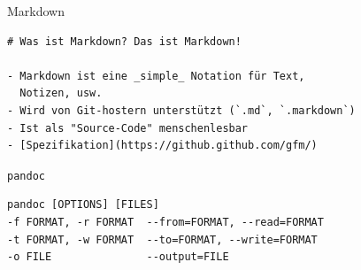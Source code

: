 \documentclass[14pt,aspectratio=169]{beamer}
\begin{document}
\begin{frame}[fragile]{\faMarkdown Markdown}
    \begin{verbatim}
# Was ist Markdown? Das ist Markdown!

- Markdown ist eine _simple_ Notation für Text, 
  Notizen, usw.
- Wird von Git-hostern unterstützt (`.md`, `.markdown`)
- Ist als "Source-Code" menschenlesbar
- [Spezifikation](https://github.github.com/gfm/)
    \end{verbatim}
\end{frame}

\begin{frame}[fragile]{\texttt{pandoc}}
    \begin{Definition}
        \begin{verbatim}
pandoc [OPTIONS] [FILES]
-f FORMAT, -r FORMAT  --from=FORMAT, --read=FORMAT                    
-t FORMAT, -w FORMAT  --to=FORMAT, --write=FORMAT                     
-o FILE               --output=FILE                   
        \end{verbatim}
        
    \end{Definition}
    \begin{Beispiel}[\faMarkdown\faArrowRight\faLaptop]
    \end{Beispiel}
\end{frame}
\end{document}
